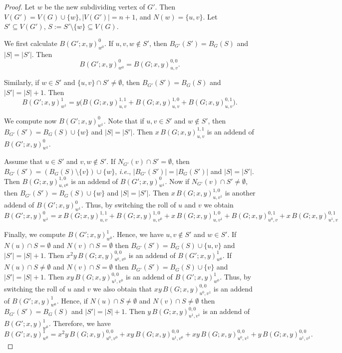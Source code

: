 \documentclass[10pt,a4paper]{amsart}
\begin{document}
\begin{proof} Let $w$ be the new subdividing vertex of $G'$.  Then $V(G')=V(G)\cup \{w\}, |V(G')|=n+1$, and
$N(w)=\{u,v\}$. Let
$S' \subseteq V(G')$, $S:= S' \setminus \{w\} \subseteq V(G)$. 

We first calculate $B(G';x,y)^{0}_{w^{0}}$.
If $u,v,w\notin S'$, then $B_{G'}(S')=B_{G}(S)$ and $|S|=|S'|$.
Then
\[
B(G';x,y)^{0}_{w^{0}}= B(G;x,y)^{0,0}_{u,v}.
\]

Similarly, if $w\in S'$ and $\{u,v\}\cap S'\neq \emptyset$, then $B_{G'}(S')=B_{G}(S)$ and $|S'|=|S|+1$.
Then
\[
B(G';x,y)^{1}_{w^{1}}= y \Big( B(G;x,y)^{1,1}_{u,v} + B(G;x,y)^{1,0}_{u,v} + B(G;x,y)^{0,1}_{u,v} \Big).
\]

We compute now $B(G';x,y)^{0}_{w^{1}}$. 
Note that if $u,v\in S'$ and $w \notin S'$, then  $B_{G'}(S')=B_{G}(S) \cup \{w\}$ and $|S|=|S'|$. 
Then
$x\,B(G;x,y)^{1,1}_{u,v}$ is an addend of $B(G';x,y)^{0}_{w^{1}}$.

Assume that $u \in S'$ and $v,w \notin S'$. If $N_{G'}(v)\cap S'=\emptyset$, then
$B_{G'}(S')=(B_{G}(S)\setminus \{v \}) \cup \{ w\}$, \emph{i.e.}, $|B_{G'}(S')|=|B_{G}(S')|$ and $|S|=|S'|$. Then $B(G;x,y)^{1,0}_{u,v^{0}}$
is an addend of $B(G';x,y)^{0}_{w^{1}}.$  
Now if $N_{G'}(v)\cap S' \neq \emptyset$, then
$B_{G'}(S')=B_{G}(S) \cup \{w \} $ and $|S|=|S'|$. Then $x\,B(G;x,y)^{1,0}_{u,v^{1}}$ is another addend of $B(G';x,y)^{0}_{w^{1}}$. Thus, by switching the roll of $u$ and $v$ we obtain
\[
 B(G';x,y)^{0}_{w^{1}} = x\,B(G;x,y)^{1,1}_{u,v} + B(G;x,y)^{1,0}_{u,v^{0}} + x\,B(G;x,y)^{1,0}_{u,v^{1}} + B(G;x,y)^{0,1}_{u^{0},v} + x\,B(G;x,y)^{0,1}_{u^{1},v}
\]

Finally, we compute $B(G';x,y)^{1}_{w^{0}}$. Hence, we have $u,v\notin S'$ and $w \in S'$. 
If $N(u)\cap S=\emptyset$ and $N(v)\cap S=\emptyset$ then  $B_{G'}(S')=B_{G}(S) \cup \{u,v\}$ and $|S'|=|S|+1$. 
Then
$x^2y\,B(G;x,y)^{0,0}_{u^0,v^0}$ is an addend of $B(G';x,y)^{1}_{w^{0}}$.
If $N(u)\cap S\neq\emptyset$ and $N(v)\cap S=\emptyset$ then  $B_{G'}(S')=B_{G}(S) \cup \{v\}$ and $|S'|=|S|+1$. 
Then
$xy\,B(G;x,y)^{0,0}_{u^1,v^0}$ is an addend of $B(G';x,y)^{1}_{w^{0}}$.
Thus, by switching the roll of $u$ and $v$ we also obtain that $xy\,B(G;x,y)^{0,0}_{u^0,v^1}$ is an addend of $B(G';x,y)^{1}_{w^{0}}$.
Hence, if $N(u)\cap S\neq\emptyset$ and $N(v)\cap S\neq\emptyset$ then  $B_{G'}(S')=B_{G}(S)$ and $|S'|=|S|+1$. 
Then
$y\,B(G;x,y)^{0,0}_{u^1,v^1}$ is an addend of $B(G';x,y)^{1}_{w^{0}}$.
Therefore, we have
\[
 B(G';x,y)^{1}_{w^{0}}= x^{2}y\,B(G;x,y)^{0,0}_{u^{0},v^{0}} +xy\,B(G;x,y)^{0,0}_{u^{1},v^{0}}+xy\,B(G;x,y)^{0,0}_{u^{0},v^{1}}
+ y\,B(G;x,y)^{0,0}_{u^{1},v^{1}}.
\]

\end{proof}
\end{document}
